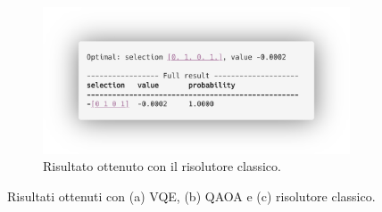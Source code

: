 \begin{figure}[h!]
\begin{subfigure}{0.49\textwidth}
    \end{subfigure}
    \hfill
    \begin{subfigure}{0.60\textwidth}
        \centering
        \includegraphics[width=\textwidth]{images/risultatoClassico.png}
        \caption{Risultato ottenuto con il risolutore classico.}
        \label{fig:risultatoClassico}
    \end{subfigure}
    \caption{Risultati ottenuti con (a) VQE, (b) QAOA e (c) risolutore classico.}
\end{figure}